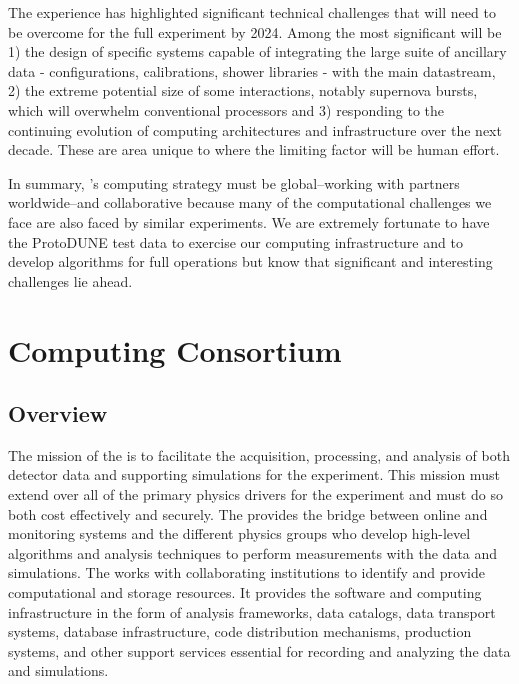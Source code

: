 The  experience has highlighted significant technical challenges that will need to be overcome for the full experiment by 2024. Among the most significant will be  1) the design of  specific systems capable of integrating the large suite of ancillary data - configurations, calibrations, shower libraries - with the main  datastream, 2) the extreme potential size of some interactions, notably supernova bursts, which will overwhelm conventional processors and 3) responding to the continuing evolution of computing architectures and infrastructure over the next decade. These are area unique to  where the limiting factor will be human effort. 

In summary, 's computing strategy must be global--working with partners worldwide--and collaborative because many of the computational challenges we face are also %
faced by similar experiments.  We are extremely fortunate to have the ProtoDUNE test data to exercise our computing infrastructure and to develop algorithms for  full  operations but know that  significant and interesting challenges lie ahead. 
 
 
\section{Computing Consortium}
\subsection{Overview}
\label{ch:exec-comp-ovr}

The mission of the  %
 is to facilitate the acquisition, processing, and analysis of both detector data and supporting simulations for the %
experiment.  This mission must extend over all of the primary physics drivers for the experiment and must do so both cost effectively and securely. The  provides the bridge between  online  and monitoring systems and the different physics groups who develop high-level algorithms and analysis techniques to perform measurements with the  data and simulations. The  works with collaborating institutions to identify and provide computational and storage resources.  %
It provides the software and computing infrastructure in the form of analysis frameworks, data catalogs, data transport systems, database infrastructure, code distribution mechanisms, production systems, and other support services essential for recording and analyzing the data and simulations. 

